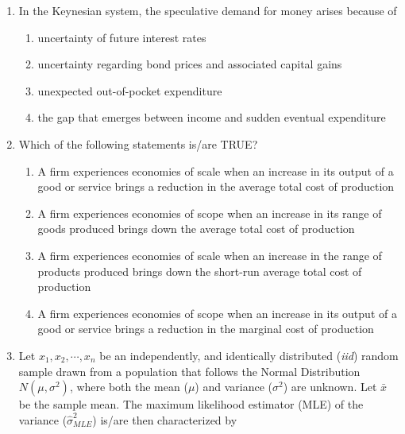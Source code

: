 \documentclass[journal,12pt,onecolumn]{exam}
\theoremstyle{remark}
\begin{document}
\begin{enumerate}
  \item In the Keynesian system, the speculative demand for money arises because of

  \begin{enumerate}[label=(\Alph*)]
    \item uncertainty of future interest rates
    \item uncertainty regarding bond prices and associated capital gains
    \item unexpected out-of-pocket expenditure
    \item the gap that emerges between income and sudden eventual expenditure
  \end{enumerate}

  \item Which of the following statements is/are TRUE?

  \begin{enumerate}[label=(\Alph*)]
    \item A firm experiences economies of scale when an increase in its output of a good or service brings a reduction in the average total cost of production
    \item A firm experiences economies of scope when an increase in its range of goods produced brings down the average total cost of production
    \item A firm experiences economies of scale when an increase in the range of products produced brings down the short-run average total cost of production
    \item A firm experiences economies of scope when an increase in its output of a good or service brings a reduction in the marginal cost of production
  \end{enumerate}

 \item Let $x_1, x_2, \cdots, x_n$ be an independently, and identically distributed (\textit{iid}) random sample drawn from a population that follows the Normal Distribution $N(\mu, \sigma^2)$, where both the mean ($\mu$) and variance ($\sigma^2$) are unknown. Let $\bar{x}$ be the sample mean. The maximum likelihood estimator (MLE) of the variance ($\hat{\sigma}^2_{MLE}$) is/are then characterized by
  

\end{enumerate}
\end{document}
